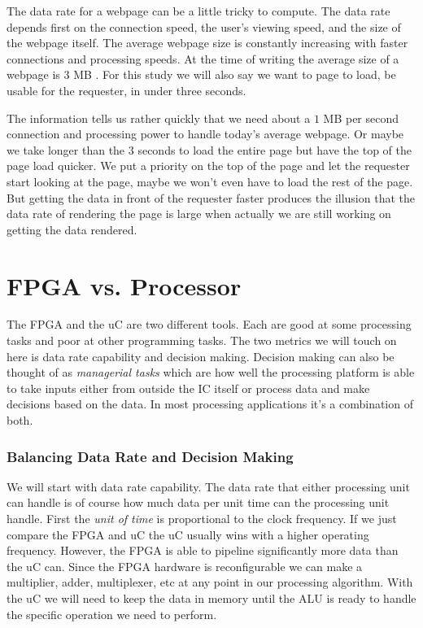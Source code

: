 The data rate for a webpage can be a little tricky to compute. The data rate depends first on the connection speed, the user's viewing speed, and the size of the webpage itself. The average webpage size is constantly increasing with faster connections and processing speeds. At the time of writing the average size of a webpage is $3$ \ac{MB} \cite{AvgWebSize}. For this study we will also say we want to page to load, be usable for the requester, in under three seconds.

The information tells us rather quickly that we need about a $1$ \ac{MB} per second connection and processing power to handle today's average webpage. Or maybe we take longer than the $3$ seconds to load the entire page but have the top of the page load quicker. We put a priority on the top of the page and let the requester start looking at the page, maybe we won't even have to load the rest of the page. But getting the data in front of the requester faster produces the illusion that the data rate of rendering the page is large when actually we are still working on getting the data rendered. 
	
\section{FPGA vs. Processor}

The \ac{FPGA} and the \ac{uC} are two different tools. Each are good at some processing tasks and poor at other programming tasks. The two metrics we will touch on here is data rate capability and decision making. Decision making can also be thought of as \emph{managerial tasks} which are how well the processing platform is able to take inputs either from outside the \ac{IC} itself or process data and make decisions based on the data. In most processing applications it's a combination of both.
	
\subsubsection{Balancing Data Rate and Decision Making}
We will start with data rate capability. The data rate that either processing unit can handle is of course how much data per unit time can the processing unit handle. First the \emph{unit of time} is proportional to the clock frequency. If we just compare the \ac{FPGA} and \ac{uC} the \ac{uC} usually wins with a higher operating frequency. However, the \ac{FPGA} is able to pipeline significantly more data than the \ac{uC} can. Since the \ac{FPGA} hardware is reconfigurable we can make a multiplier, adder, multiplexer, etc at any point in our processing algorithm. With the \ac{uC} we will need to keep the data in memory until the \ac{ALU} is ready to handle the specific operation we need to perform.

